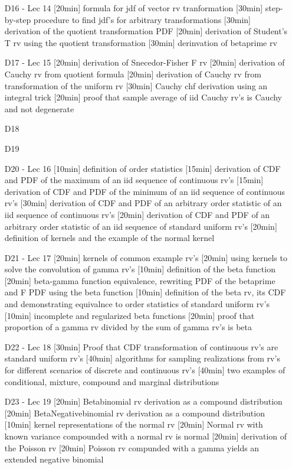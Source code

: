 \begin{enumerate}
\item[D16 - Lec 14] [20min] formula for jdf of vector rv tranformation [30min] step-by-step procedure to find jdf's for arbitrary transformations [30min] derivation of the quotient transformation PDF [20min] derivation of Student's T rv using the quotient transformation [30min] derinvation of betaprime rv

\item[D17 - Lec 15] [20min] derivation of Snecedor-Fisher F rv [20min] derivation of Cauchy rv from quotient formula [20min] derivation of Cauchy rv from transformation of the uniform rv [30min] Cauchy chf derivation using an integral trick [20min] proof that sample average of iid Cauchy rv's is Cauchy and not degenerate

\item[D18] 
\item[D19] 


\item[D20 - Lec 16] [10min] definition of order statistics [15min] derivation of CDF and PDF of the maximum of an iid sequence of continuous rv's [15min] derivation of CDF and PDF of the minimum of an iid sequence of continuous rv's [30min] derivation of CDF and PDF of an arbitrary order statistic of an iid sequence of continuous rv's [20min] derivation of CDF and PDF of an arbitrary order statistic of an iid sequence of standard uniform rv's [20min] definition of kernels and the example of the normal kernel

\item[D21 - Lec 17] [20min] kernels of common example rv's [20min] using kernels to solve the convolution of gamma rv's [10min] definition of the beta function [20min] beta-gamma function equivalence, rewriting PDF of the betaprime and F PDF using the beta function [10min] definition of the beta rv, its CDF and demonstrating equivalnce to order statistics of standard uniform rv's [10min] incomplete and regularized beta functions [20min] proof that proportion of a gamma rv  divided by the sum of gamma rv's is beta

\item[D22 - Lec 18] [30min] Proof that CDF transformation of continuous rv's are standard uniform rv's [40min] algorithms for sampling realizations from rv's for different scenarios of discrete and continuous rv's [40min] two examples of conditional, mixture, compound and marginal distributions

\item[D23 - Lec 19] [20min] Betabinomial rv derivation as a compound distribution [20min] BetaNegativebinomial rv derivation as a compound distribution [10min] kernel representations of the normal rv [20min] Normal rv with known variance compounded with a normal rv is normal [20min] derivation of the Poisson rv [20min] Poisson rv compunded with a gamma yields an extended negative binomial


\end{enumerate}
